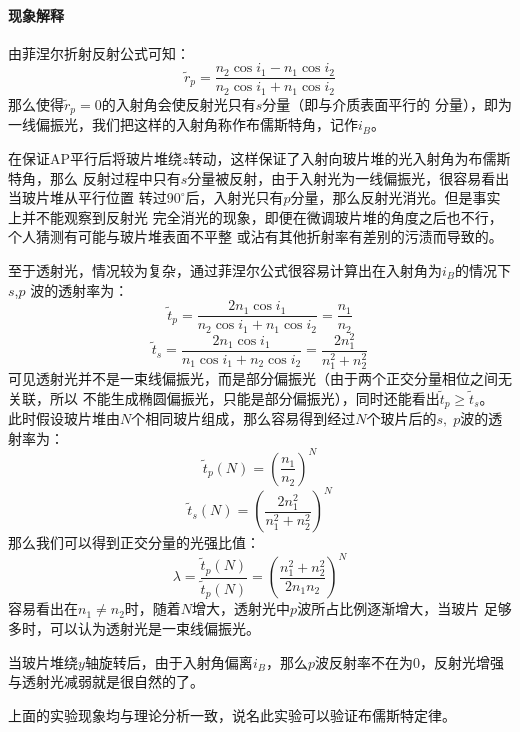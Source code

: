\documentclass[a4paper]{ctexart}
\begin{document}
    \paragraph{现象解释}
    由菲涅尔折射反射公式可知：
    $$
    \widetilde{r}_{p} = \frac{n_{2}\cos{i_{1} - n_{1}\cos{i_{2}}}}{n_{2}\cos{i_{1}} + n_{1}\cos{i_{2}}}
    $$
    那么使得$\widetilde{r}_{p}=0$的入射角会使反射光只有$s$分量（即与介质表面平行的
    分量），即为一线偏振光，我们把这样的入射角称作布儒斯特角，记作$i_{B}$。
    \par 
    在保证AP平行后将玻片堆绕$z$转动，这样保证了入射向玻片堆的光入射角为布儒斯特角，那么
    反射过程中只有$s$分量被反射，由于入射光为一线偏振光，很容易看出当玻片堆从平行位置
    转过$90^\circ$后，入射光只有$p$分量，那么反射光消光。但是事实上并不能观察到反射光
    完全消光的现象，即便在微调玻片堆的角度之后也不行，个人猜测有可能与玻片堆表面不平整
    或沾有其他折射率有差别的污渍而导致的。
    \par 
    至于透射光，情况较为复杂，通过菲涅尔公式很容易计算出在入射角为$i_{B}$的情况下$s$,$p$
    波的透射率为：
    $$
    \widetilde{t}_{p} = \frac{2n_{1}\cos{i_{1}}}{n_{2}\cos{i_{1}} + n_{1}\cos{i_{2}}} = \frac{n_{1}}{n_{2}}
    $$
    $$
    \widetilde{t}_{s} = \frac{2n_{1}\cos{i_{1}}}{n_{1}\cos{i_{1}} + n_{2}\cos{i_{2}}} = \frac{2n_{1}^{2}}{n_{1}^{2} + n_{2}^{2}}
    $$
    可见透射光并不是一束线偏振光，而是部分偏振光（由于两个正交分量相位之间无关联，所以
    不能生成椭圆偏振光，只能是部分偏振光），同时还能看出$\widetilde{t}_{p}\ge \widetilde{t}_{s}$。
    此时假设玻片堆由$N$个相同玻片组成，那么容易得到经过$N$个玻片后的$s,\;p$波的透射率为：
    $$
    \widetilde{t}_{p}(N) = \left(\frac{n_{1}}{n_{2}}\right)^{N}
    $$
    $$
    \widetilde{t}_{s}(N) = \left(\frac{2n_{1}^{2}}{n_{1}^{2} + n_{2}^{2}}\right)^{N}
    $$
    那么我们可以得到正交分量的光强比值：
    $$
    \lambda = \frac{\widetilde{t}_{p}(N)}{\widetilde{t}_{p}(N)} = \left(\frac{n_{1}^{2} + n_{2}^{2}}{2n_{1}n_{2}}\right)^{N}
    $$
    容易看出在$n_{1}\ne n_{2}$时，随着$N$增大，透射光中$p$波所占比例逐渐增大，当玻片
    足够多时，可以认为透射光是一束线偏振光。
    \par 
    当玻片堆绕$y$轴旋转后，由于入射角偏离$i_{B}$，那么$p$波反射率不在为0，反射光增强
    与透射光减弱就是很自然的了。
    \par 
    上面的实验现象均与理论分析一致，说名此实验可以验证布儒斯特定律。
\end{document}

